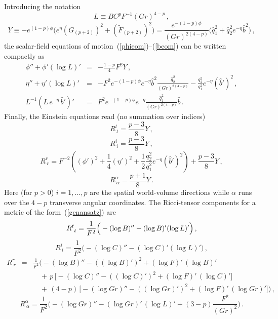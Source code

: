 \documentclass[a4paper,11pt]{article}
\newcommand{\qh}{\hat{q}} \newcommand{\hh}{\hat{h}}
\newcommand{\nn}{\nonumber}  \newcommand{\spa}{\,,\qquad}
\newcommand{\eqref}[1]{(\ref{#1})}
\begin{document}
%
Introducing the notation
%
\begin{equation}
L \equiv B C^p F^{-1} (Gr)^{4-p} \,,
\end{equation}
%
\begin{equation}
Y \equiv -e^{(1-p)\phi} \Big( e^\eta (G_{(p+2)})^2 +
 (\tilde{F}_{(p+2)})^2 \Big) = \frac{e^{-(1-p)\phi}}{(Gr)^{2(4-p)}}
 \Big( \qh_1^2 + \qh_2^2 e^{-\eta} \hat{b}^2 \Big) \,,
\end{equation}
the scalar-field equations of motion~\eqref{phieom}--\eqref{beom} can
be written compactly as
%
\begin{eqnarray}
\label{dilequ}
\phi'' + \phi' (\log L)' &=& - \frac{1-p}{4} F^2 Y \,, \\
%
\label{etaequ}
\eta'' + \eta' (\log L)' &=& - F^2 e^{-(1-p)\phi} e^{-\eta} \hat{b}^2
\frac{\qh_2^2}{(Gr)^{2(4-p)}} - \frac{q_2^2}{q_1^2}e^{-\eta}
(\hat{b}')^2 \,, \\
%
\label{bequ}
L^{-1} (L\,e^{-\eta}\,\hat{b}')' &=& F^2 e^{-(1-p)\phi} e^{-\eta}
\frac{\qh_1^2}{(Gr)^{2(4-p)}} \hat{b} \,.
\end{eqnarray}
%
Finally, the Einstein equations read (no summation over indices)
%
\begin{equation}
\label{Rttequ}
R^t_{\ t} = \frac{p-3}{8} Y \,,
\end{equation}
%
\begin{equation}
\label{Riiequ}
R^i_{\ i} = \frac{p-3}{8} Y \,,
\end{equation}
%
\begin{equation}
\label{Rrrequ}
R^r_{\ r} = F^{-2} \left( (\phi')^2 + \frac{1}{4} (\eta')^2 +
\frac{1}{2} \frac{q_2^2}{q_1^2} e^{-\eta} (\hat{b}' )^2 \right) +
\frac{p-3}{8} Y \,,
\end{equation}
%
\begin{equation}
\label{Raaequ}
R^\alpha_{\ \alpha} = \frac{p+1}{8} Y \,.
\end{equation}
%
Here (for $p>0$) $i=1,\ldots,p$ are the spatial world-volume directions
while $\alpha$ runs over the $4-p$ transverse angular coordinates. The
Ricci-tensor components for a metric of the form~\eqref{genansatz} are
%
\begin{equation}
R^{t}_{\ t} = \frac{1}{F^2} \Big(-(\log B)''-(\log B)'(\log L)'\Big)
\,,\\[2ex]
\end{equation}
%
\begin{equation}
R^{i}_{\ i} = \frac{1}{F^2} \Big( - (\log C)'' - (\log C)' (\log L)'
\Big) \,,
\end{equation}
%
\begin{eqnarray}
R^{r}_{\ r} &=& \frac{1}{F^2} \Big( -(\log B)'' - ((\log B)')^2
   +(\log F)'\,(\log B)' \nn \\ & & \quad +\,p\,\Big[-(\log C)''
   -((\log C)')^2 + (\log F)'\,(\log C)' \Big] \nn \\ & & \quad
   +\,(4-p)\,\Big[ -(\log Gr)'' -((\log Gr)')^2
   + (\log F)'\,(\log Gr)'\Big] \Big) \,,
\end{eqnarray}
%
\begin{equation}
\label{Raa}
R^{\alpha}_{\ \alpha} = \frac{1}{F^2} \Big( -(\log Gr)''
- (\log Gr)'\,(\log L)' + (3-p) \frac{F^2}{(Gr)^2} \Big) \,.
\end{equation}
%
\end{document}
